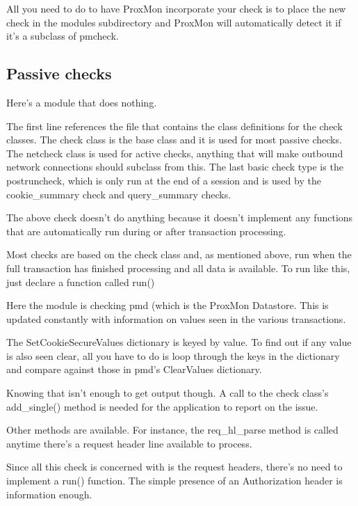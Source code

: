 \documentclass{article}
\begin{document}
All you need to do to have ProxMon incorporate your check is to place the
new check in the modules subdirectory and ProxMon will automatically detect it if 
it's a subclass of pmcheck.

\subsection{Passive checks}
Here's a module that does nothing.


The first line references the file that contains the class definitions for the
check classes.  The check class is the base class and it is used for most passive
checks.  The netcheck class is used for active checks, anything that will make 
outbound network connections should subclass from this.  The last basic check 
type is the postruncheck, which is only run at the end of a session and is used
by the cookie\_summary check and query\_summary checks.

The above check doesn't do anything because it doesn't implement any functions
that are automatically run during or after transaction processing.

Most checks are based on the check class and, as mentioned above, run when the 
full transaction has finished processing and all data is available.  To run like 
this, just declare a function called run()


Here the module is checking pmd (which is the ProxMon Datastore.  This is
updated constantly with information on values seen in the various transactions.

The SetCookieSecureValues dictionary is keyed by value.  To find out if any
value is also seen clear, all you have to do is loop through the keys in
the dictionary and compare against those in pmd's ClearValues dictionary.

Knowing that isn't enough to get output though.  A call to the check class's
add\_single() method is needed for the application to report on the issue.

Other methods are available.  For instance, the req\_hl\_parse method is
called anytime there's a request header line available to process.


Since all this check is concerned with is the request headers, there's no need
to implement a run() function.  The simple presence of an Authorization header
is information enough.
\end{document}
